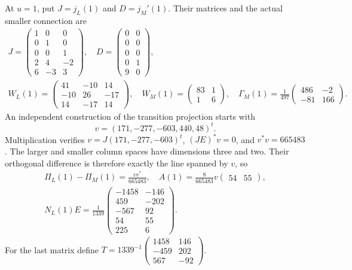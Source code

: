 At $u=1$, put $J=j_L(1)$ and $D=j_M'(1)$. Their matrices and
the actual smaller connection are
\[
 \begin{gathered}
 J=\begin{pmatrix}1&0&0\\0&1&0\\0&0&1\\2&4&-2\\6&-3&3\end{pmatrix},\quad
 D=\begin{pmatrix}0&0\\0&0\\0&0\\0&1\\9&0\end{pmatrix},\\
 W_L(1)=\begin{pmatrix}41&-10&14\\-10&26&-17\\14&-17&14\end{pmatrix},\quad
 W_M(1)=\begin{pmatrix}83&1\\1&6\end{pmatrix},\quad
 \Gamma_M(1)=\frac1{497}\begin{pmatrix}486&-2\\-81&166\end{pmatrix}.
 \end{gathered}
 \tag{NT.33}
\]
An independent construction of the transition projection starts with
\[v=(171,-277,-603,440,48)^t.\]
Multiplication verifies
$v=J(171,-277,-603)^t$, $(JE)^*v=0$, and $v^*v=665483$.
The larger and smaller column spaces have dimensions three and two.
Their orthogonal difference is therefore exactly the line spanned
by $v$, so
\[
 \begin{gathered}
 \Pi_L(1)-\Pi_M(1)=\frac{vv^*}{665483},\quad
 A(1)=\frac8{665483}v\begin{pmatrix}54&55\end{pmatrix},\\
 N_L(1)E=\frac1{1339}
 \begin{pmatrix}-1458&-146\\459&-202\\-567&92\\54&55\\225&6\end{pmatrix}.
 \end{gathered}
 \tag{NT.34}
\]
For the last matrix define
$T=1339^{-1}\left(\begin{smallmatrix}1458&146\\-459&202\\567&-92\end{smallmatrix}\right)$.
